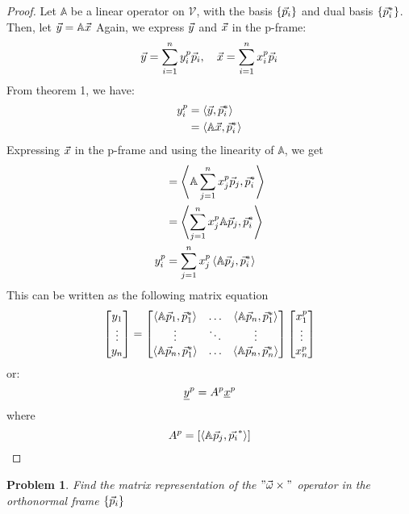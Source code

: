 \documentclass{article}
\newtheorem{prop}{Problem}
\begin{document}
\begin{proof}
    Let $\mathbb{A}$ be a linear operator on $\mathcal{V}$, with the basis $\{\vec{p}_i\}$ and dual basis
    $\{\vec{p}^*_i\}$. Then, let $\vec{y} = \mathbb{A}\vec{x}$
    Again, we express $\vec{y}$ and $\vec{x}$ in the p-frame:
    $$\vec{y} = \sum_{i=1}^ny_i^p\vec{p}_i, \quad \vec{x} = \sum_{i=1}^nx_i^p\vec{p}_i$$ 
    From theorem 1, we have:
    \begin{align*}
        y_i^p &= \left<\vec{y}, \vec{p}^*_i\right> \\
        &= \left<\mathbb{A}\vec{x}, \vec{p}^*_i\right> \\
    \end{align*}
    Expressing $\vec{x}$ in the p-frame and using the linearity of $\mathbb{A}$, we get
    \begin{align*}
        &= \left< \mathbb{A}\sum_{j=1}^nx_j^p\vec{p}_j, \vec{p}^*_i\right> \\
        &= \left< \sum_{j=1}^nx_j^p\mathbb{A}\vec{p}_j, \vec{p}^*_i\right> \\
        y_i^p&= \sum_{j=1}^nx_j^p\left<\mathbb{A}\vec{p}_j, \vec{p}^*_i\right>
    \end{align*}
    This can be written as the following matrix equation
    $$\begin{bmatrix}
        y_1 \\ \vdots \\ y_n
    \end{bmatrix} = 
    \begin{bmatrix}
        \left< \mathbb{A}\vec{p}_1, \vec{p}^*_1\right>&  \hdots  & \left< \mathbb{A}\vec{p}_n, \vec{p}^*_1\right> \\
        \vdots  & \ddots & \vdots \\
        \left< \mathbb{A}\vec{p}_n, \vec{p}^*_1\right> & \hdots & \left< \mathbb{A}\vec{p}_n, \vec{p}^*_n\right>
    \end{bmatrix}
    \begin{bmatrix}
        x_1^p \\ \vdots \\ x_n^p
    \end{bmatrix}$$
    or:
    $$\underline{y}^p = A^p\underline{x}^p$$ 
    where
    $$ A^p = \left[\left<\mathbb{A}\vec{p}_j, \vec{p_i}^*\right>\right]$$
\end{proof}


\begin{prop}
    Find the matrix representation of the $" \vec{\omega} \times "$ operator in the orthonormal frame $\{\vec{p}_i\}$
\end{prop}
\end{document}

